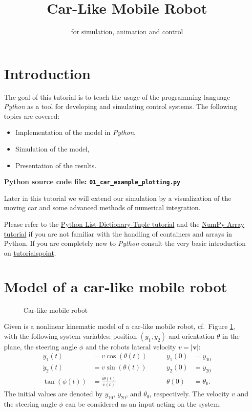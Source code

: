 \documentclass[a4paper,11pt,headings=standardclasses,parskip=half]{scrartcl}
\title{Car-Like Mobile Robot}
\subtitle{\py for simulation, animation and control}%
\author{}
\date{}
\newcommand{\py}{\emph{Python}\xspace}
\begin{document}
\maketitle%

\tableofcontents

\newpage

\section{Introduction}
The goal of this tutorial is to teach the usage of the programming language \py as a tool for developing and simulating control systems. The following topics are covered:
\begin{itemize}
\item Implementation of the model in \py,
\item Simulation of the model,
\item Presentation of the results.
\end{itemize}
\textbf{Python source code file: \texttt{01\_car\_example\_plotting.py}}

Later in this tutorial we will extend our simulation by a visualization of the moving car and some advanced methods of numerical integration.

Please refer to the \href{http://cs231n.github.io/python-numpy-tutorial/#python-containers}{Python List-Dictionary-Tuple tutorial} and the \href{http://cs231n.github.io/python-numpy-tutorial/#numpy}{NumPy Array tutorial} if you are not familiar with the handling of containers and arrays in Python. If you are completely new to \py consult the very basic introduction on \href{https://www.tutorialspoint.com/python/index.htm}{tutorialspoint}.

\section{Model of a car-like mobile robot}
\label{sec:model}
\begin{figure}[ht]
  \centering
  \def\svgwidth{0.7\textwidth}
  
  \caption{Car-like mobile robot}
  \label{fig:car}
\end{figure}
Given is a nonlinear kinematic model of a car-like mobile robot, cf.~Figure \ref{fig:car}, with the following system variables: position $(y_1, y_2)$ and orientation $\theta$ in the plane, the steering angle $\phi$ and the robots lateral velocity $v=\left| \mathbf{v} \right| $: 
\begin{subequations}\label{eq:syseq}
\begin{alignat}{2}
\dot{y}_1(t)&=v \cos (\theta(t)) &\qquad y_1(0) &= y_{10}\\
\dot{y}_2(t)&=v \sin (\theta(t)) &\qquad y_2(0) &= y_{20}\\
\tan(\phi(t)) &= \frac{l\dot{\theta}(t)}{v(t)} &\qquad \theta(0) &= \theta_{0}.
\end{alignat}
\end{subequations}
The initial values are denoted by $y_{10}$, $y_{20}$, and $\theta_0$, respectively. The velocity $v$ and the steering angle $\phi$ can be considered as an input acting on the system.
\end{document}
